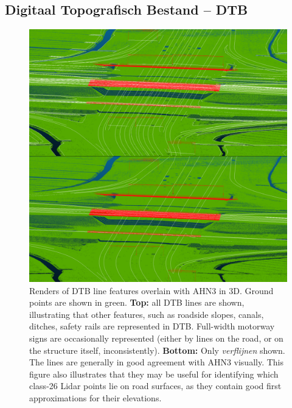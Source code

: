 \subsection{Digitaal Topografisch Bestand – DTB}
\label{sub:dtb}

\begin{figure}[h!]
    \centering
    \includegraphics[width=0.95\linewidth]{p2/figs/ahn_sample_10.png} 
    \caption{Renders of DTB line features overlain with AHN3 in 3D. Ground points are shown in green. \textbf{Top:} all DTB lines are shown, illustrating that other features, such as roadside slopes, canals, ditches, safety rails are represented in DTB. Full-width motorway signs are occasionally represented (either by lines on the road, or on the structure itself, inconsistently). \textbf{Bottom:} Only \textit{verflijnen} shown. The lines are generally in good agreement with AHN3 visually. This figure also illustrates that they may be useful for identifying which class-26 Lidar points lie on road surfaces, as they contain good first approximations for their elevations.}
    \label{fig:dtbahn}
\end{figure}


